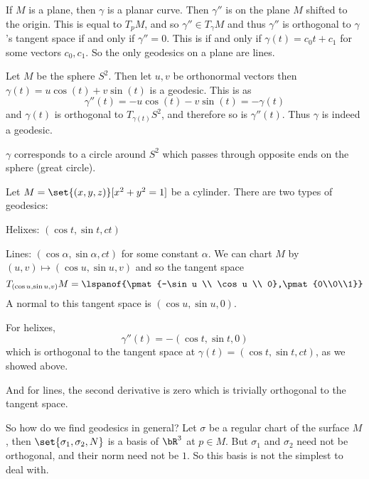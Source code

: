\begin{exam*}

    \benum
        \item If $M$ is a plane, then $\gamma$ is a planar curve.
        Then $\gamma''$ is on the plane $M$ shifted to the origin.
        This is equal to $T_pM$, and so $\gamma''\in T_\gamma M$ and thus $\gamma''$ is orthogonal to $\gamma$'s tangent space if and only if $\gamma''=0$.
        This is if and only if $\gamma(t)=c_0t+c_1$ for some vectors $c_0,c_1$.
        So the only geodesics on a plane are lines.

        \item Let $M$ be the sphere $S^2$.
        Then let $u,v$ be orthonormal vectors then $\gamma(t)=u\cos(t)+v\sin(t)$ is a geodesic.
        This is as
        \[ \gamma''(t) = -u\cos(t) - v\sin(t) = -\gamma(t) \]
        and $\gamma(t)$ is orthogonal to $T_{\gamma(t)}S^2$, and therefore so is $\gamma''(t)$.
        Thus $\gamma$ is indeed a geodesic.

        $\gamma$ corresponds to a circle around $S^2$ which passes through opposite ends on the sphere (great circle).

        \item Let $M=\set{(x,y,z)}[x^2+y^2=1]$ be a cylinder.
        There are two types of geodesics:
        \benum
            \item Helixes: $(\cos t,\sin t,ct)$
            \item Lines: $(\cos\alpha,\sin\alpha,ct)$ for some constant $\alpha$.
        \eenum
        We can chart $M$ by $(u,v)\mapsto(\cos u,\sin u,v)$ and so the tangent space
        \[ T_{(\cos u,\sin u,v)}M = \lspanof{\pmat{-\sin u \\ \cos u \\ 0},\pmat{0\\0\\1}} \]
        A normal to this tangent space is $(\cos u,\sin u,0)$.

        For helixes,
        \[ \gamma''(t) = -(\cos t,\sin t,0) \]
        which is orthogonal to the tangent space at $\gamma(t)=(\cos t,\sin t,ct)$, as we showed above.

        And for lines, the second derivative is zero which is trivially orthogonal to the tangent space.
    \eenum

\end{exam*}

So how do we find geodesics in general?
Let $\sigma$ be a regular chart of the surface $M$, then $\set{\sigma_1,\sigma_2,N}$ is a basis of $\bR^3$ at $p\in M$.
But $\sigma_1$ and $\sigma_2$ need not be orthogonal, and their norm need not be $1$.
So this basis is not the simplest to deal with.

